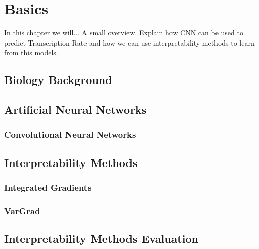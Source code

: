 \chapter{Basics}
\label{ch:basics}

In this chapter we will...
A small overview. Explain how CNN can be used to predict Transcription Rate and how we can use interpretability methods to learn from this models.

\section{Biology Background}
\label{sec:basics:bio_back}

\section{Artificial Neural Networks}
\label{sec:basics:Cellular_Expression}

\subsection{Convolutional Neural Networks}
\label{sec:basics:CNN}

\section{Interpretability Methods}
\label{sec:basics:interpretability_methods}


\subsection{Integrated Gradients}
\label{sec:basics:IG}



\subsection{VarGrad}
\label{sec:basics:VarGrad}



\section{Interpretability Methods Evaluation}
\label{sec:basics:vgig_eval}

